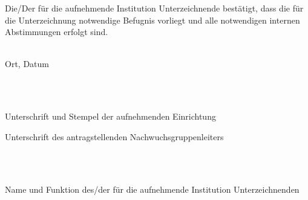 \documentclass[a4paper,10pt,ngerman,numbers=noenddot]{scrreprt}
\newcommand{\signature}{Unterschrift des antragstellenden Nachwuchsgruppenleiters}
\newcommand{\signature}{Unterschrift der antragstellenden Nachwuchsgruppenleiterin}
\begin{document}
Die/Der für die aufnehmende Institution Unterzeichnende bestätigt, dass die für die Unterzeichnung notwendige Befugnis vorliegt und alle notwendigen internen Abstimmungen erfolgt sind.\\[0.75cm]


\underline{\hspace{7.5cm}}\\
\begin{small}Ort, Datum\end{small}\\[1.2cm]


\underline{\hspace{7.5cm}}\hspace{1cm}\underline{\hspace{7.5cm}}\\
\parbox{7.5cm}{Unterschrift und Stempel der aufnehmenden Einrichtung}\hspace{1cm}\parbox{7.5cm}{\signature}\\[0.75cm]

\underline{\hspace{7.5cm}}\\
\parbox{7.5cm}{Name und Funktion des/der für die
aufnehmende Institution Unterzeichnenden}
\end{document}
